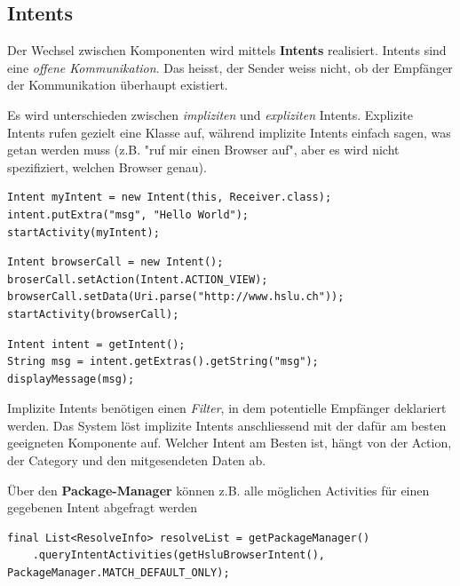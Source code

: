 \documentclass[a4paper, 11pt]{article}
\begin{document}
\subsection{Intents}
Der Wechsel zwischen Komponenten wird mittels \textbf{Intents} realisiert. Intents sind eine \textit{offene Kommunikation}. Das heisst, der Sender weiss nicht, ob der Empfänger der Kommunikation überhaupt existiert. 

Es wird unterschieden zwischen \textit{impliziten} und \textit{expliziten} Intents. Explizite Intents rufen gezielt eine Klasse auf, während implizite Intents einfach sagen, was getan werden muss (z.B. "ruf mir einen Browser auf", aber es wird nicht spezifiziert, welchen Browser genau). \\

\begin{lstlisting}[captionpos=b, caption={Beispiel eines expliziten Intents}]
Intent myIntent = new Intent(this, Receiver.class);
intent.putExtra("msg", "Hello World");
startActivity(myIntent);
\end{lstlisting}

\begin{lstlisting}[captionpos=b, caption={Beispiel eines impliziten Intents}]
Intent browserCall = new Intent();
broserCall.setAction(Intent.ACTION_VIEW);
browserCall.setData(Uri.parse("http://www.hslu.ch"));
startActivity(browserCall);
\end{lstlisting}

\begin{lstlisting}[captionpos=b, caption={Empfangen und Auswerten eines Intents}]
Intent intent = getIntent();
String msg = intent.getExtras().getString("msg");
displayMessage(msg);
\end{lstlisting}

Implizite Intents benötigen einen \textit{Filter}, in dem potentielle Empfänger deklariert werden. Das System löst implizite Intents anschliessend mit der dafür am besten geeigneten Komponente auf. Welcher Intent am Besten ist, hängt von der Action, der Category und den mitgesendeten Daten ab.
\vspace{10px}

\noindent Über den \textbf{Package-Manager} können z.B. alle möglichen Activities für einen gegebenen Intent abgefragt werden

\begin{lstlisting}[caption={}]
final List<ResolveInfo> resolveList = getPackageManager()
	.queryIntentActivities(getHsluBrowserIntent(), PackageManager.MATCH_DEFAULT_ONLY);
\end{lstlisting}
\end{document}
